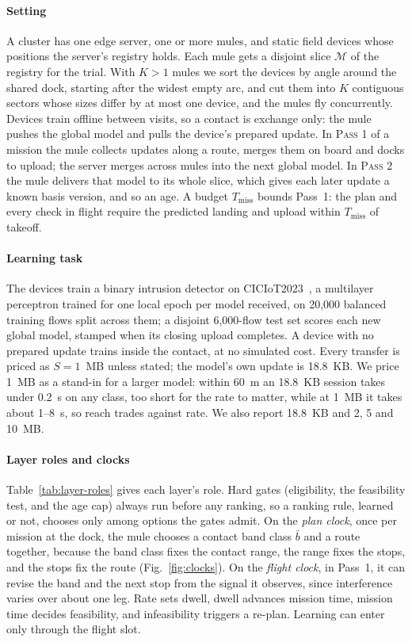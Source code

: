 \documentclass[conference]{IEEEtran}
\newcommand{\bbar}{\bar{b}}
\begin{document}
\paragraph{Setting}
A cluster has one edge server, one or more mules, and static field devices whose
positions the server's registry holds. Each mule gets a disjoint slice
$\mathcal{M}$ of the registry for the trial. With $K>1$ mules we sort the devices
by angle around the shared dock, starting after the widest empty arc, and cut them
into $K$ contiguous sectors whose sizes differ by at most one device, and the
mules fly concurrently. Devices train offline between visits, so a contact is
exchange only: the mule pushes the global model and pulls the device's prepared
update. In \textsc{Pass 1} of a mission the mule collects updates along a route,
merges them on board and docks to upload; the server merges across mules into
the next global model. In \textsc{Pass 2} the mule delivers that model to its
whole slice, which gives each later update a known basis version, and so an age.
A budget $T_{\mathrm{miss}}$ bounds Pass~1: the plan and every check in flight
require the predicted landing and upload within $T_{\mathrm{miss}}$ of takeoff.

\paragraph{Learning task}
The devices train a binary intrusion detector on CICIoT2023~\cite{CiCIoT2023}, a
multilayer perceptron trained for one local epoch per model received, on 20{,}000
balanced training flows split across them; a disjoint 6{,}000-flow test set
scores each new global model, stamped when its closing upload completes. A device
with no prepared update trains inside the contact, at no simulated cost. Every
transfer is priced as $S=1$~MB unless stated; the model's own update is
18.8~KB. We price 1~MB as a stand-in for a larger model: within 60~m an 18.8~KB
session takes under 0.2~s on any class, too short for the rate to matter, while at
1~MB it takes about 1--8~s, so reach trades against rate. We also report 18.8~KB
and 2, 5 and 10~MB.

\paragraph{Layer roles and clocks}
Table~\ref{tab:layer-roles} gives each layer's role. Hard gates (eligibility, the
feasibility test, and the age cap) always run before any ranking, so a ranking
rule, learned or not, chooses only among options the gates admit. On the
\emph{plan clock}, once per mission at the dock, the mule chooses a contact band
class $\bbar$ and a route together, because the band class fixes the contact
range, the range fixes the stops, and the stops fix the route
(Fig.~\ref{fig:clocks}). On the \emph{flight clock}, in Pass~1, it can revise the
band and the next stop from the signal it observes, since interference varies
over about one leg. Rate sets dwell, dwell advances mission time, mission time
decides feasibility, and infeasibility triggers a re-plan. Learning can enter
only through the flight slot.
\end{document}
